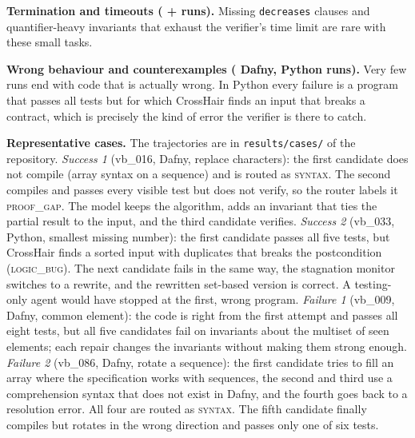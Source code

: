 \textbf{Termination and timeouts ( +  runs).} Missing \texttt{decreases} clauses and quantifier-heavy invariants that exhaust the verifier's time limit are rare with these small tasks.

\textbf{Wrong behaviour and counterexamples ( Dafny,  Python runs).} Very few runs end with code that is actually wrong. In Python every failure is a program that passes all tests but for which CrossHair finds an input that breaks a contract, which is precisely the kind of error the verifier is there to catch.

\textbf{Representative cases.} The trajectories are in \texttt{results/cases/} of the repository. \emph{Success 1} (vb\_016, Dafny, replace characters): the first candidate does not compile (array syntax on a sequence) and is routed as \textsc{syntax}. The second compiles and passes every visible test but does not verify, so the router labels it \textsc{proof\_gap}. The model keeps the algorithm, adds an invariant that ties the partial result to the input, and the third candidate verifies. \emph{Success 2} (vb\_033, Python, smallest missing number): the first candidate passes all five tests, but CrossHair finds a sorted input with duplicates that breaks the postcondition (\textsc{logic\_bug}). The next candidate fails in the same way, the stagnation monitor switches to a rewrite, and the rewritten set-based version is correct. A testing-only agent would have stopped at the first, wrong program. \emph{Failure 1} (vb\_009, Dafny, common element): the code is right from the first attempt and passes all eight tests, but all five candidates fail on invariants about the multiset of seen elements; each repair changes the invariants without making them strong enough. \emph{Failure 2} (vb\_086, Dafny, rotate a sequence): the first candidate tries to fill an array where the specification works with sequences, the second and third use a comprehension syntax that does not exist in Dafny, and the fourth goes back to a resolution error. All four are routed as \textsc{syntax}. The fifth candidate finally compiles but rotates in the wrong direction and passes only one of six tests.
